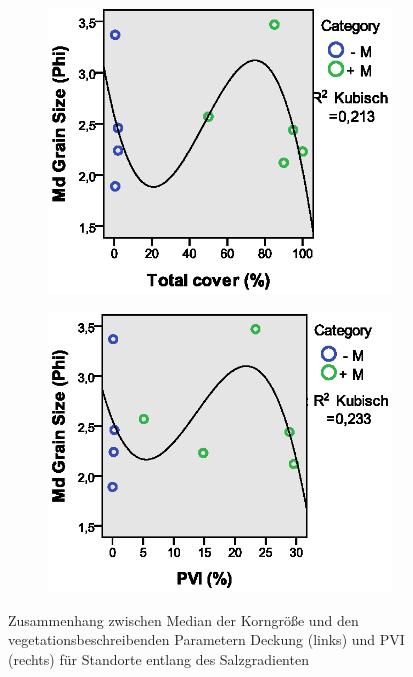 \begin{figure}[htb]
        \centering
        \begin{subfigure}[htb]{0.45\textwidth}
                \includegraphics[width=\textwidth]{images/salzsedimentauswertung/gz_vs_cover.eps}
        \end{subfigure}
        \begin{subfigure}[htb]{0.45\textwidth}
                \includegraphics[width=\textwidth]{images/salzsedimentauswertung/gz_vs_pvi.eps}
        \end{subfigure}
        \caption[Regressionsmodell: Vegetation und Median der Korngröße für Stationen des Salzgradienten]												{Zusammenhang zwischen Median der Korngröße und den 																vegetationsbeschreibenden Parametern Deckung (links) und PVI (rechts) für 											Standorte entlang des Salzgradienten}
        \label{fig: Regression_Vegetation_Korngroesse}
\end{figure}

